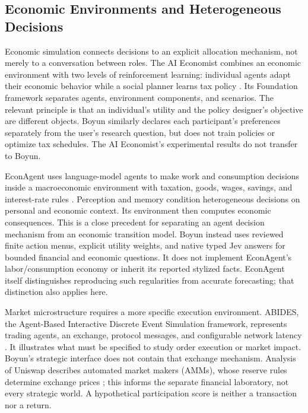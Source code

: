 \subsection{Economic Environments and Heterogeneous Decisions}
Economic simulation connects decisions to an explicit allocation mechanism,
not merely to a conversation between roles. The AI Economist combines an
economic environment with two levels of reinforcement learning: individual
agents adapt their economic behavior while a social planner learns tax policy
\cite{zheng2020}. Its Foundation framework separates agents, environment
components, and scenarios. The relevant principle is that an individual's
utility and the policy designer's objective are different objects. Boyun
similarly declares each participant's preferences separately from the user's
research question, but does not train policies or optimize tax schedules.
The AI Economist's experimental results do not transfer to Boyun.

EconAgent uses language-model agents to make work and consumption decisions
inside a macroeconomic environment with taxation, goods, wages, savings, and
interest-rate rules \cite{li2024econagent}. Perception and memory condition
heterogeneous decisions on personal and economic context. Its environment
then computes economic consequences. This is a close precedent for separating
an agent decision mechanism from an economic transition model. Boyun instead
uses reviewed finite action menus, explicit utility weights, and native typed
Jev answers for bounded financial and economic questions. It does not implement
EconAgent's labor/consumption economy or inherit its reported stylized facts.
EconAgent itself distinguishes reproducing such regularities from accurate
forecasting; that distinction also applies here.

Market microstructure requires a more specific execution environment. ABIDES,
the Agent-Based Interactive Discrete Event Simulation framework, represents
trading agents, an exchange, protocol messages, and configurable network
latency \cite{byrd2019}. It illustrates what must be specified to study order
execution or market impact. Boyun's strategic interface does not contain that
exchange mechanism. Analysis of Uniswap describes automated market makers
(AMMs), whose reserve rules determine exchange prices \cite{angeris2021};
this informs the separate financial laboratory, not every strategic world.
A hypothetical participation score is neither a transaction nor a return.

